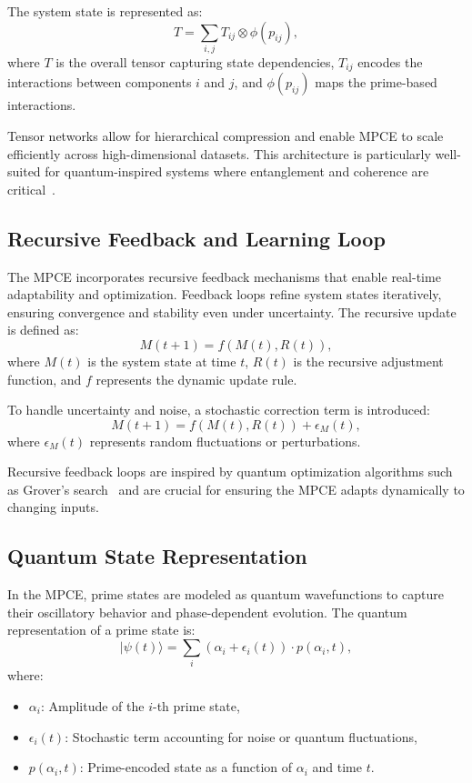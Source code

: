 \documentclass{article}
\theoremstyle{plain}
\begin{document}
The system state is represented as:
\begin{equation}
    T = \sum_{i, j} T_{ij} \otimes \phi(p_{ij}),
\end{equation}
where \( T \) is the overall tensor capturing state dependencies, \( T_{ij} \) encodes the interactions between components \( i \) and \( j \), and \( \phi(p_{ij}) \) maps the prime-based interactions.

Tensor networks allow for hierarchical compression and enable MPCE to scale efficiently across high-dimensional datasets. This architecture is particularly well-suited for quantum-inspired systems where entanglement and coherence are critical~\cite{vidal2003efficient, wang2021quantum}.

\subsection{Recursive Feedback and Learning Loop}

The MPCE incorporates recursive feedback mechanisms that enable real-time adaptability and optimization. Feedback loops refine system states iteratively, ensuring convergence and stability even under uncertainty. The recursive update is defined as:
\begin{equation}
    M(t+1) = f(M(t), R(t)),
\end{equation}
where \( M(t) \) is the system state at time \( t \), \( R(t) \) is the recursive adjustment function, and \( f \) represents the dynamic update rule.

To handle uncertainty and noise, a stochastic correction term is introduced:
\begin{equation}
    M(t+1) = f(M(t), R(t)) + \epsilon_M(t),
\end{equation}
where \( \epsilon_M(t) \) represents random fluctuations or perturbations.

Recursive feedback loops are inspired by quantum optimization algorithms such as Grover's search~\cite{grover1996fast} and are crucial for ensuring the MPCE adapts dynamically to changing inputs.

\subsection{Quantum State Representation}

In the MPCE, prime states are modeled as quantum wavefunctions to capture their oscillatory behavior and phase-dependent evolution. The quantum representation of a prime state is:
\begin{equation}
    |\psi(t)\rangle = \sum_{i} \left( \alpha_i + \epsilon_i(t) \right) \cdot p(\alpha_i, t),
\end{equation}
where:
\begin{itemize}
    \item \( \alpha_i \): Amplitude of the \( i \)-th prime state,
    \item \( \epsilon_i(t) \): Stochastic term accounting for noise or quantum fluctuations,
    \item \( p(\alpha_i, t) \): Prime-encoded state as a function of \( \alpha_i \) and time \( t \).
\end{itemize}
\end{document}
